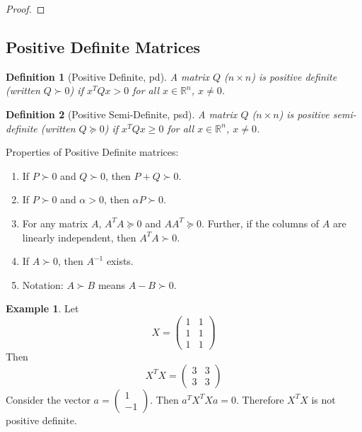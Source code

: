 \documentclass[12pt]{article}
\newtheorem{definition}{Definition}
\theoremstyle{definition}
\newtheorem{example}{Example}
\newcommand{\R}{\mathbb{R}}
\begin{document}
\begin{proof}

\end{proof}

\subsection{Positive Definite Matrices}
\begin{definition}[Positive Definite, pd]
A matrix $Q$ ($n \times n$) is positive definite (written $Q \succ 0$) if $x^T Q x > 0$ for all $x \in \R^n$, $x \neq 0$. 
\end{definition}

\begin{definition}[Positive Semi-Definite, psd]
A matrix $Q$ ($n \times n$) is positive semi-definite (written $Q \succeq 0$) if $x^T Q x \geq 0$ for all $x \in \R^n$, $x \neq 0$. 
\end{definition}

Properties of Positive Definite matrices:
\begin{enumerate}
	\item If $P \succ 0$ and $Q \succ 0$, then $P+Q \succ 0$.
	\item If $P \succ 0$ and $\alpha > 0$, then $\alpha P \succ 0$.
	\item For any matrix $A$, $A^T A \succeq 0$ and $AA^T \succeq 0$. Further, if the columns of $A$ are linearly independent, then $A^T A \succ 0$.
	\item If $A \succ 0$, then $A^{-1}$ exists.
	\item Notation: $A \succ B$ means $A - B \succ 0$.
\end{enumerate}


\begin{example}
Let
\begin{equation}
	X = 
	\begin{pmatrix}
	1 & 1 \\
	1 & 1 \\
	1 & 1
	\end{pmatrix}
\end{equation}
Then 
\begin{equation}
	X^T X = 
	\begin{pmatrix}
	3 & 3 \\
	3 & 3
	\end{pmatrix}
\end{equation}
Consider the vector $a = \begin{pmatrix} 1 \\ -1 \end{pmatrix}$. Then $a^T X^T X a = 0$. Therefore $X^T X$ is not positive definite. 
\end{example}	
\end{document}
